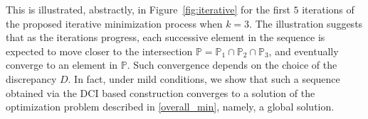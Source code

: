 \documentclass{article}
\newcommand{\p}{\mathbb{P}}
\begin{document}
This is illustrated, abstractly, in Figure~\ref{fig:iterative} for the first $5$ iterations of the proposed iterative minimization process when $k = 3$. 
The illustration suggests that as the iterations progress, each successive element in the sequence is expected to move closer to the intersection $\p = \p_{1} \cap \p_{2} \cap \p_{3}$, and eventually converge to an element in $\p$. 
Such convergence depends on the choice of the discrepancy $D$.
In fact, under mild conditions, we show that such a sequence obtained via the DCI based construction converges to a solution of the optimization problem described in \eqref{overall_min}, namely, a global solution.

    
    
    
    
    
    
    
    
\end{document}
